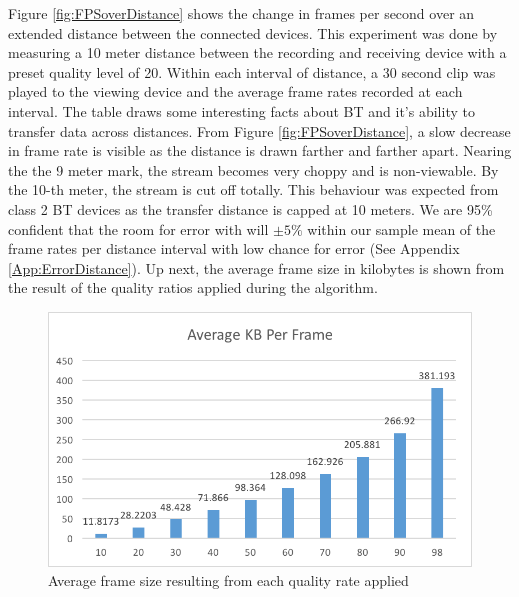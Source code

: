 \documentclass[a4paper,12pt]{article}
\begin{document}
Figure \ref{fig:FPSoverDistance} shows the change in frames per second over an extended distance between the connected devices. This experiment was done by measuring a 10 meter distance between the recording and receiving device with a preset quality level of 20. Within each interval of distance, a 30 second clip was played to the viewing device and the average frame rates recorded at each interval. The table draws some interesting facts about BT and it’s ability to transfer data across distances. From Figure  \ref{fig:FPSoverDistance}, a slow decrease in frame rate is visible as the distance is drawn farther and farther apart. Nearing the the 9 meter mark, the stream becomes very choppy and is non-viewable. By the 10-th meter, the stream is cut off totally. This behaviour was expected from class 2 BT devices as the transfer distance is capped at 10 meters. We are 95\% confident that the room for error with will $\pm5\%$ within our sample mean of the frame rates per distance interval with low chance for error (See Appendix \ref{App:ErrorDistance}). Up next, the average frame size in kilobytes is shown from the result of the quality ratios applied during the algorithm. 

\begin{figure}[h!]
\centering
\includegraphics[scale=1]{Figures/Figure10.png}
\caption{Average frame size resulting from each quality rate applied}
\label{fig:AvgFramesQuality}
\end{figure}
\end{document}
